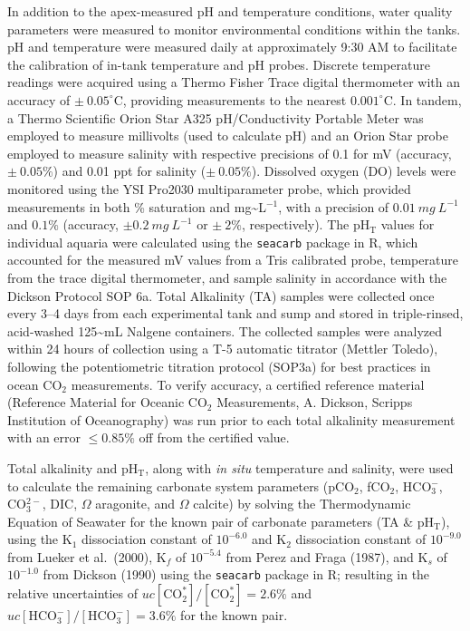 \documentclass{CSUNthesis}
\begin{document}
In addition to the apex-measured pH and temperature conditions, water quality parameters were measured to monitor environmental conditions within the tanks. pH and temperature were measured daily at approximately 9:30 AM to facilitate the calibration of in-tank temperature and pH probes. Discrete temperature readings were acquired using a Thermo Fisher Trace digital thermometer with an accuracy of \(\pm~0.05^\circ\)C, providing measurements to the nearest \(0.001^\circ\)C. In tandem, a Thermo Scientific Orion Star A325 pH/Conductivity Portable Meter was employed to measure millivolts (used to calculate pH) and an Orion Star probe employed to measure salinity with respective precisions of 0.1 for mV (accuracy, \(\pm~0.05\%\)) and 0.01 ppt for salinity (\(\pm~0.05\%\)). Dissolved oxygen (DO) levels were monitored using the YSI Pro2030 multiparameter probe, which provided measurements in both \% saturation and mg\textasciitilde L\(^{-1}\), with a precision of \(0.01~mg~L^{-1}\) and \(0.1\%\) (accuracy, \(\pm 0.2~mg~L^{-1}\) or \(\pm~2\%\), respectively). The pH\(_\mathrm{T}\) values for individual aquaria were calculated using the \texttt{seacarb} package in R, which accounted for the measured mV values from a Tris calibrated probe, temperature from the trace digital thermometer, and sample salinity in accordance with the Dickson Protocol SOP 6a. Total Alkalinity (TA) samples were collected once every 3--4 days from each experimental tank and sump and stored in triple-rinsed, acid-washed 125\textasciitilde mL Nalgene containers. The collected samples were analyzed within 24 hours of collection using a T-5 automatic titrator (Mettler Toledo), following the potentiometric titration protocol (SOP3a) for best practices in ocean CO\(_2\) measurements. To verify accuracy, a certified reference material (Reference Material for Oceanic CO\(_2\) Measurements, A. Dickson, Scripps Institution of Oceanography) was run prior to each total alkalinity measurement with an error \(\leq0.85\%\) off from the certified value.

Total alkalinity and pH\(_\mathrm{T}\), along with \textit{in situ} temperature and salinity, were used to calculate the remaining carbonate system parameters (pCO\(_2\), fCO\(_2\), HCO\(_3^-\), CO\(_3^{2-}\), DIC, \(\Omega\) aragonite, and \(\Omega\) calcite) by solving the Thermodynamic Equation of Seawater for the known pair of carbonate parameters (TA \& pH\(_\mathrm{T}\)), using the K\(_1\) dissociation constant of \(10^{-6.0}\) and K\(_2\) dissociation constant of \(10^{-9.0}\) from Lueker et al.~(2000), K\(_f\) of \(10^{-5.4}\) from Perez and Fraga (1987), and K\(_s\) of \(10^{-1.0}\) from Dickson (1990) using the \texttt{seacarb} package in R; resulting in the relative uncertainties of \(uc[\text{CO}_2^*]/[\text{CO}_2^*] = 2.6\%\) and \(uc[\text{HCO}_3^-]/[\text{HCO}_3^-] = 3.6\%\) for the known pair.
\end{document}

